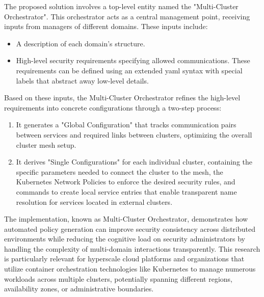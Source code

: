 The proposed solution involves a top-level entity named the "Multi-Cluster Orchestrator"\cite{bringhenti_security_2023}. This orchestrator acts as a central management point, receiving inputs from managers of different domains\cite{bringhenti_security_2023}. These inputs include:
\begin{itemize}
\item A description of each domain's structure\cite{bringhenti_security_2023}.
\item High-level security requirements specifying allowed communications\cite{bringhenti_security_2023}. These requirements can be defined using an extended \gls{yaml} syntax with special labels that abstract away low-level details\cite{bringhenti_security_2023}.
\end{itemize}
Based on these inputs, the Multi-Cluster Orchestrator refines the high-level requirements into concrete configurations through a two-step process\cite{bringhenti_security_2023}:
\begin{enumerate}
\item It generates a "Global Configuration" that tracks communication pairs between services and required links between clusters, optimizing the overall cluster mesh setup\cite{bringhenti_security_2023}.
\item It derives "Single Configurations" for each individual cluster, containing the specific parameters needed to connect the cluster to the mesh, the Kubernetes Network Policies to enforce the desired security rules, and commands to create local service entries that enable transparent name resolution for services located in external clusters\cite{bringhenti_security_2023}.
\end{enumerate}
The implementation, known as Multi-Cluster Orchestrator, demonstrates how automated policy generation can improve security consistency across distributed environments while reducing the cognitive load on security administrators by handling the complexity of multi-domain interactions transparently\cite{bringhenti_security_2023}. This research is particularly relevant for hyperscale cloud platforms and organizations that utilize container orchestration technologies like Kubernetes to manage numerous workloads across multiple clusters, potentially spanning different regions, availability zones, or administrative boundaries\cite{bringhenti_security_2023}.

